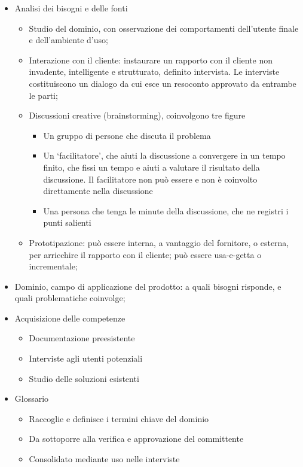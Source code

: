 \begin{itemize}
  \item Analisi dei bisogni e delle fonti

    \begin{itemize}
      \item Studio del dominio, con osservazione dei comportamenti dell'utente
            finale e dell'ambiente d'uso;
      \item Interazione con il cliente: instaurare un rapporto con il cliente
            non invadente, intelligente e strutturato, definito intervista. Le
            interviste costituiscono un dialogo da cui esce un resoconto
            approvato da entrambe le parti;
      \item Discussioni creative (brainstorming), coinvolgono tre figure

        \begin{itemize}
          \item Un gruppo di persone che discuta il problema
          \item Un `facilitatore', che aiuti la discussione a convergere in un
                tempo finito, che fissi un tempo e aiuti a valutare il risultato
                della discussione. Il facilitatore non può essere
                 e non è coinvolto direttamente nella
                discussione
          \item Una persona che tenga le minute della discussione, che ne
                registri i punti salienti
        \end{itemize}

      \item Prototipazione: può essere interna, a vantaggio del fornitore, o
            esterna, per arricchire il rapporto con il cliente; può essere
            usa-e-getta o incrementale;
    \end{itemize}

  \item Dominio, campo di applicazione del prodotto: a quali bisogni risponde, e
        quali problematiche coinvolge;
  \item Acquisizione delle competenze

    \begin{itemize}
      \item Documentazione preesistente
      \item Interviste agli utenti potenziali
      \item Studio delle soluzioni esistenti
    \end{itemize}

  \item Glossario

    \begin{itemize}
      \item Raccoglie e definisce i termini chiave del dominio
      \item Da sottoporre alla verifica e approvazione del committente
      \item Consolidato mediante uso nelle interviste
    \end{itemize}

\end{itemize}

